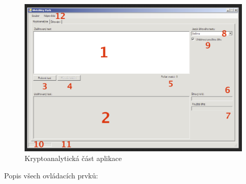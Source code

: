 \documentclass[12pt]{article}
\theoremstyle{definition}
\begin{document}
\begin{figure}[h]
  \begin{center}
  \includegraphics[scale=0.4]{images/cryptauto.eps}
  \end{center}
\caption{Kryptoanalytická část aplikace}
\label{img_crypt}
\end{figure}

Popis všech ovládacích prvků:
\end{document}
